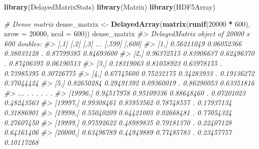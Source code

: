 \documentclass[]{book}
\newenvironment{Shaded}{\begin{snugshade}}{\end{snugshade}}
\newcommand{\KeywordTok}[1]{\textcolor[rgb]{0.13,0.29,0.53}{\textbf{#1}}}
\newcommand{\DataTypeTok}[1]{\textcolor[rgb]{0.13,0.29,0.53}{#1}}
\newcommand{\DecValTok}[1]{\textcolor[rgb]{0.00,0.00,0.81}{#1}}
\newcommand{\StringTok}[1]{\textcolor[rgb]{0.31,0.60,0.02}{#1}}
\newcommand{\CommentTok}[1]{\textcolor[rgb]{0.56,0.35,0.01}{\textit{#1}}}
\newcommand{\OperatorTok}[1]{\textcolor[rgb]{0.81,0.36,0.00}{\textbf{#1}}}
\newcommand{\NormalTok}[1]{#1}
\begin{document}
\begin{Shaded}
\begin{Highlighting}[]
\KeywordTok{library}\NormalTok{(DelayedMatrixStats)}
\KeywordTok{library}\NormalTok{(Matrix)}
\KeywordTok{library}\NormalTok{(HDF5Array)}

\CommentTok{# Dense matrix}
\NormalTok{dense_matrix <-}\StringTok{ }\KeywordTok{DelayedArray}\NormalTok{(}\KeywordTok{matrix}\NormalTok{(}\KeywordTok{runif}\NormalTok{(}\DecValTok{20000} \OperatorTok{*}\StringTok{ }\DecValTok{600}\NormalTok{), }\DataTypeTok{nrow =} \DecValTok{20000}\NormalTok{,}
                                  \DataTypeTok{ncol =} \DecValTok{600}\NormalTok{))}
\NormalTok{dense_matrix}
\CommentTok{#> DelayedMatrix object of 20000 x 600 doubles:}
\CommentTok{#>                [,1]       [,2]       [,3] ...     [,599]     [,600]}
\CommentTok{#>     [1,] 0.56211049 0.06052366 0.38033128   . 0.87799385 0.84693600}
\CommentTok{#>     [2,] 0.96372515 0.83906637 0.62496370   . 0.87406395 0.06190513}
\CommentTok{#>     [3,] 0.18319063 0.81058923 0.63978155   . 0.73985395 0.30726775}
\CommentTok{#>     [4,] 0.67745600 0.75232175 0.34283933   . 0.19136272 0.37044424}
\CommentTok{#>     [5,] 0.82650284 0.29491392 0.09360019   . 0.86290053 0.63351816}
\CommentTok{#>      ...          .          .          .   .          .          .}
\CommentTok{#> [19996,] 0.94517978 0.95109336 0.88648460   . 0.07201023 0.48243563}
\CommentTok{#> [19997,] 0.99308461 0.85953562 0.78748557   . 0.17937134 0.31886901}
\CommentTok{#> [19998,] 0.55040209 0.64421003 0.02668481   . 0.77054324 0.27607450}
\CommentTok{#> [19999,] 0.97592622 0.48989835 0.79181370   . 0.22407128 0.64161406}
\CommentTok{#> [20000,] 0.63496789 0.44949889 0.77485783   . 0.23457757 0.10117268}


\end{Highlighting}
\end{Shaded}
\end{document}
